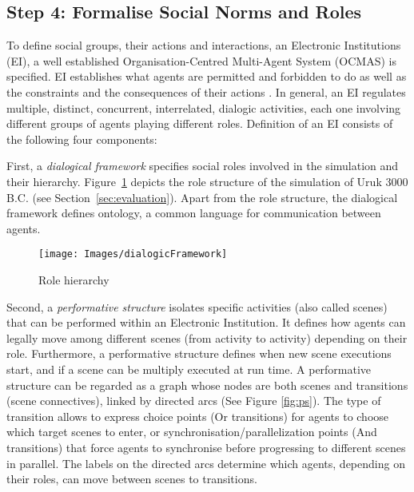 \subsection{Step 4: Formalise Social Norms and Roles}

\label{sec:step4}

To define social groups, their actions and interactions, an Electronic Institutions (EI), a well established Organisation-Centred Multi-Agent System (OCMAS) is specified. EI establishes what agents are permitted and forbidden to do as well as the constraints and the consequences of their actions \cite{esteva2003}. In general, an EI regulates multiple, distinct, concurrent, interrelated, dialogic activities, each one involving different groups of agents playing different roles. Definition of an EI consists of the following four components:

First, a \textit{dialogical framework} specifies social roles involved in the simulation and their hierarchy. Figure~\ref{fig:df} depicts the role structure of the simulation of Uruk 3000 B.C. (see Section~\ref{sec:evaluation}). Apart from the role structure, the dialogical framework defines ontology, a common language for communication between agents. 

\begin{figure}[t]
\sidecaption[t]
\texttt{[image: Images/dialogicFramework]}
\caption{Role hierarchy}
\label{fig:df}       %
\end{figure}



Second, a \textit{performative structure} isolates specific activities (also called scenes) that can be performed within an Electronic Institution. It defines how agents can legally move among different scenes (from activity to activity) depending on their role. Furthermore, a performative structure defines when new scene executions start, and if a scene can be multiply executed at run time. A performative structure can be regarded as a graph whose nodes are both scenes and transitions (scene connectives), linked by directed arcs (See Figure \ref{fig:ps}). The type of transition allows to express choice points (Or transitions) for agents to choose which target scenes to enter, or synchronisation/parallelization points (And transitions) that force agents to synchronise before progressing to different scenes in parallel. The labels on the directed arcs determine which agents, depending on their roles, can move between scenes to transitions.


